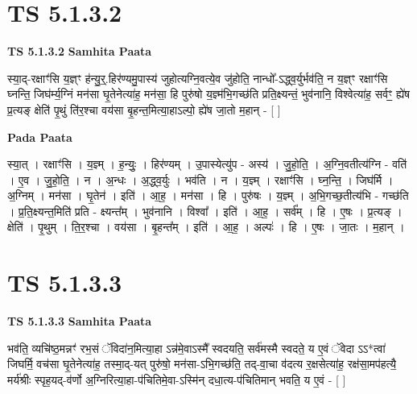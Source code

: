 \documentclass[17pt]{extarticle}
\begin{document}
\section*{ TS 5.1.3.2 }

\textbf{TS 5.1.3.2 } \newline
\textbf{Samhita Paata} \newline

स्या॒द्-रक्षाꣳ॑सि य॒ज्ञ्ꣳ ह॑न्यु॒र्॒.हिर॑ण्यमु॒पास्य॑ जुहोत्यग्नि॒वत्ये॒व जु॑होति॒ नान्धो᳚-ऽद्ध्व॒र्युर्भव॑ति॒ न य॒ज्ञ्ꣳ रक्षाꣳ॑सि घ्नन्ति॒ जिघ॑र्म्य॒ग्निं मन॑सा घृ॒तेनेत्या॑ह॒ मन॑सा॒ हि पुरु॑षो य॒ज्ञ्म॑भि॒गच्छ॑ति प्रति॒क्ष्यन्तं॒ भुव॑नानि॒ विश्वेत्या॑ह॒ सर्वꣳ॒॒ ह्ये॑ष प्र॒त्यङ् क्षेति॑ पृ॒थुं ति॑र॒श्चा वय॑सा बृ॒हन्त॒मित्या॒हाऽल्पो॒ ह्ये॑ष जा॒तो म॒हान् - [  ] \newline

\textbf{Pada Paata} \newline

स्या॒त् । रक्षाꣳ॑सि । य॒ज्ञ्म् । ह॒न्युः॒ । हिर॑ण्यम् । उ॒पास्येत्यु॑प - अस्य॑ । जु॒हो॒ति॒ । अ॒ग्नि॒वतीत्य॑ग्नि - वति॑ । ए॒व । जु॒हो॒ति॒ । न । अ॒न्धः । अ॒द्ध्व॒र्युः । भव॑ति । न । य॒ज्ञ्म् । रक्षाꣳ॑सि । घ्न॒न्ति॒ । जिघ॑र्मि । अ॒ग्निम् । मन॑सा । घृ॒तेन॑ । इति॑ । आ॒ह॒ । मन॑सा । हि । पुरु॑षः । य॒ज्ञ्म् । अ॒भि॒गच्छ॒तीत्य॑भि - गच्छ॑ति । प्र॒ति॒क्ष्यन्त॒मिति॑ प्रति - क्ष्यन्त᳚म् । भुव॑नानि । विश्वा᳚ । इति॑ । आ॒ह॒ । सर्व᳚म् । हि । ए॒षः । प्र॒त्यङ् । क्षेति॑ । पृ॒थुम् । ति॒र॒श्चा । वय॑सा । बृ॒हन्त᳚म् । इति॑ । आ॒ह॒ । अल्पः॑ । हि । ए॒षः । जा॒तः । म॒हान् ।  \newline




\section*{ TS 5.1.3.3 }

\textbf{TS 5.1.3.3 } \newline
\textbf{Samhita Paata} \newline

भव॑ति॒ व्यचि॑ष्ठ॒मन्नꣳ॑ रभ॒सं ॅविदा॑न॒मित्या॒हा ऽन्न॑मे॒वाऽस्मै᳚ स्वदयति॒ सर्व॑मस्मै स्वदते॒ य ए॒वं ॅवेदा ऽऽ*त्वा॑ जिघर्मि॒ वच॑सा घृ॒तेनेत्या॑ह॒ तस्मा॒द्-यत् पुरु॑षो॒ मन॑सा-ऽभि॒गच्छ॑ति॒ तद्-वा॒चा व॑दत्य र॒क्षसेत्या॑ह॒ रक्ष॑सा॒मप॑हत्यै॒ मर्य॑श्रीः स्पृह॒यद्-व॑र्णो अ॒ग्निरित्या॒हा-प॑चितिमे॒वा-ऽस्मि॑न् दधा॒त्य-प॑चितिमान् भवति॒ य ए॒वं - [  ] \newline
\end{document}
